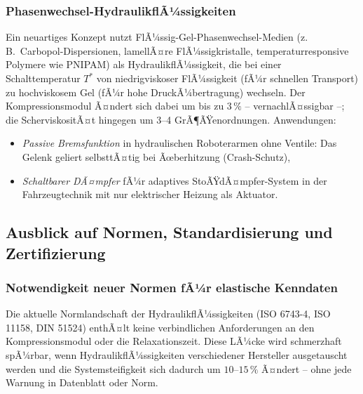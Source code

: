﻿\documentclass[a4paper,12pt]{scrreprt}
\theoremstyle{definition}
\begin{document}
\subsubsection{Phasenwechsel-HydraulikflÃ¼ssigkeiten}

Ein neuartiges Konzept nutzt FlÃ¼ssig-Gel-Phasenwechsel-Medien
(z.\,B.\ Carbopol-Disper\-sionen, lamellÃ¤re FlÃ¼ssigkristalle,
temperaturresponsive Polymere wie PNIPAM) als HydraulikflÃ¼ssigkeit,
die bei einer Schalttemperatur $T^*$ von niedrigviskoser FlÃ¼ssigkeit
(fÃ¼r schnellen Transport) zu hochviskosem Gel (fÃ¼r hohe Druck\-Ã¼bertragung)
wechseln. Der Kompressionsmodul Ã¤ndert sich dabei um bis zu
$3\,\%$ -- vernachlÃ¤ssigbar --; die ScherviskositÃ¤t hingegen um
3--4 GrÃ¶ÃŸenordnungen. Anwendungen:
\begin{itemize}
  \item \emph{Passive Bremsfunktion} in hydraulischen Roboterarmen
    ohne Ventile: Das Gelenk geliert selbsttÃ¤tig bei Ãœberhitzung
    (Crash-Schutz),
  \item \emph{Schaltbarer DÃ¤mpfer} fÃ¼r adaptives StoÃŸdÃ¤mpfer-System
    in der Fahrzeugtechnik mit nur elektrischer Heizung als Aktuator.
\end{itemize}

\subsection{Ausblick auf Normen, Standardisierung und Zertifizierung}

\subsubsection{Notwendigkeit neuer Normen fÃ¼r elastische Kenndaten}

Die aktuelle Normlandschaft der HydraulikflÃ¼ssigkeiten (ISO 6743-4,
ISO 11158, DIN 51524) enthÃ¤lt keine verbindlichen Anforderungen an
den Kompressionsmodul oder die Relaxationszeit. Diese LÃ¼cke wird
schmerzhaft spÃ¼rbar, wenn HydraulikflÃ¼ssigkeiten verschiedener
Hersteller ausgetauscht werden und die Systemsteifigkeit sich dadurch
um $10$--$15\,\%$ Ã¤ndert -- ohne jede Warnung in Datenblatt oder Norm.
\end{document}
